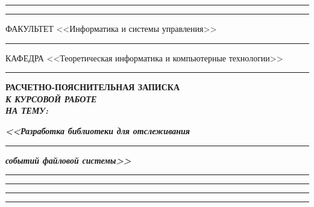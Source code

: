 \documentclass[14pt, russian]{scrartcl}
\begin{document}
\begin{titlepage}
	\vspace{-2pt}
	\hspace{-34.5pt}\rule{\textwidth}{2.5pt}

	\vspace*{-20.3pt}
	\hspace{-34.5pt}\rule{\textwidth}{0.4pt}

	\vspace{0.5ex}
	\noindent \small ФАКУЛЬТЕТ\hspace{80pt} <<Информатика и системы управления>>

	\vspace*{-16pt}
	\hspace{35pt}\rule{0.855\textwidth}{0.4pt}

	\vspace{0.5ex}
	\noindent \small КАФЕДРА\hspace{50pt} <<Теоретическая информатика и компьютерные технологии>>

	\vspace*{-16pt}
	\hspace{25pt}\rule{0.875\textwidth}{0.4pt}


	\vspace{3em}

	\begin{center}
		\Large \bf{РАСЧЕТНО-ПОЯСНИТЕЛЬНАЯ ЗАПИСКА\\\textbf{\textit{К КУРСОВОЙ РАБОТЕ\\НА ТЕМУ:}} \\}
	\end{center}

	\vspace*{-6ex}
	\begin{center}
		\Large{\textit{\textbf{<<Разработка библиотеки для отслеживания }}}

		\vspace*{-3ex}
		\rule{0.9\textwidth}{1.2pt}

		\vspace*{-0.2ex}
		\Large{\textit{\textbf{событий файловой системы>>}}}
		\vspace*{-3ex}
		\vspace*{-0.2ex}
		\rule{0.9\textwidth}{1.2pt}

		\vspace*{-0.2ex}
		\rule{0.9\textwidth}{1.2pt}

		\vspace*{-0.2ex}
		\rule{0.9\textwidth}{1.2pt}

		\vspace*{-0.2ex}
		\rule{0.9\textwidth}{1.2pt}
	\end{center}


\end{titlepage}
\end{document}
